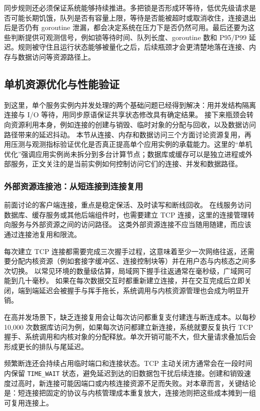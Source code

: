 同步规则还必须保证系统能够持续推进。多把锁是否形成环等待，低优先级请求是否可能长期饥饿，队列是否有容量上限，等待是否能被超时或取消收住，连接退出后是否仍有 goroutine 泄漏，都会决定系统在压力下是否仍然可用。最后还要为这些判断提供可观测信号，例如锁等待时间、队列长度、goroutine 数和 P95/P99 延迟。规则被守住且运行状态能够被量化之后，后续瓶颈才会更清楚地落在连接、内存与数据访问等资源路径上。



\subsection{单机资源优化与性能验证}\label{sec3:single-node-scaling}

到这里，单个服务实例内并发处理的两个基础问题已经得到解决：用并发结构隔离连接与 I/O 等待，用同步原语保证共享状态修改具有确定结果。
接下来瓶颈会转向资源利用本身，例如连接的创建与销毁、临时对象的分配与回收，以及数据访问路径带来的延迟抖动。
本节从连接、内存和数据访问三个方面讨论资源复用，再用压测与观测指标验证优化是否真正提高单个应用实例的承载能力。这里的“单机优化”强调应用实例尚未拆分到多台计算节点；数据库或缓存可以是独立进程或外部服务，正文关注的是当前实例如何控制访问它们的连接、并发和数据路径。

\subsubsection{外部资源连接池：从短连接到连接复用}\label{sec3:connection-pool}

前面讨论的客户端连接，重点是稳定保活、及时读写和断线回收。
在线服务访问数据库、缓存服务或其他后端组件时，也需要建立 TCP 连接，这里的连接管理转向服务与外部资源之间的访问路径。
这类外部资源连接不应当随用随建，而应该通过连接池复用和限流。

每次建立 TCP 连接都需要完成三次握手过程，这意味着至少一次网络往返，还需要分配内核资源（例如套接字缓冲区、连接控制块等）并在用户态与内核态之间多次切换。
以常见环境的数量级估算，局域网下握手往返通常在毫秒级，广域网可能到几十毫秒。
如果在每次数据交互时都重新建立连接，并在交互完成后立即关闭，端到端延迟会被握手与挥手拖长，系统调用与内核资源管理也会成为明显开销。

在高并发场景下，缺乏连接复用会让每次访问都重复支付建连与断连成本。以每秒 10,000 次数据库访问为例，如果每次访问都建立新连接，系统就要反复执行 TCP 握手、系统调用和内核对象的分配释放。单次开销可能不大，但大量请求叠加后会形成更长的排队与尾延迟。

频繁断连还会持续占用临时端口和连接状态。TCP 主动关闭方通常会在一段时间内保留 \texttt{TIME\_WAIT} 状态，避免延迟到达的旧数据包干扰后续连接。创建和销毁速度过高时，新连接可能因端口或内核连接资源不足而失败。对本章而言，关键结论是：短连接把固定的协议与内核管理成本重复放大，连接池则把这些成本摊到一组可复用连接上。

